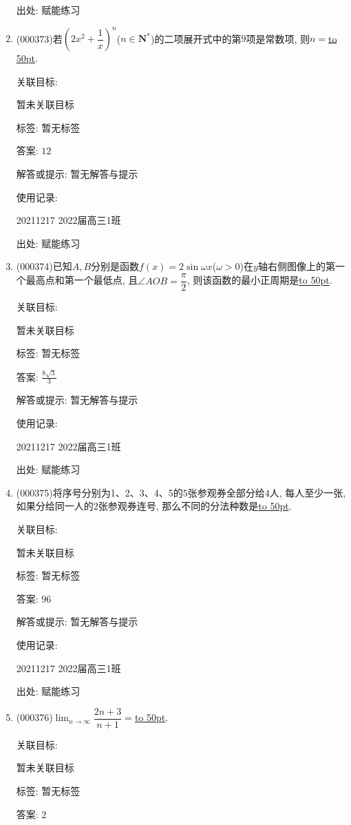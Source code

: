 \documentclass[10pt,a4paper]{article}
\newcommand{\blank}[1]{\underline{\hbox to #1pt{}}}
\begin{document}
\begin{enumerate}[1.]
出处: 赋能练习
\item { (000373)}若$(2x^2+\dfrac1x)^n$($n\in \mathbf{N}^*$)的二项展开式中的第$9$项是常数项, 则$n=$\blank{50}.


关联目标:

暂未关联目标



标签: 暂无标签

答案: $12$

解答或提示: 暂无解答与提示

使用记录:

20211217	2022届高三1班	


出处: 赋能练习
\item { (000374)}已知$A,B$分别是函数$f(x)=2\sin \omega x$($\omega >0$)在$y$轴右侧图像上的第一个最高点和第一个最低点, 且$\angle AOB=\dfrac\pi 2$, 则该函数的最小正周期是\blank{50}.


关联目标:

暂未关联目标



标签: 暂无标签

答案: $\frac{8\sqrt 3}3$

解答或提示: 暂无解答与提示

使用记录:

20211217	2022届高三1班	


出处: 赋能练习
\item { (000375)}将序号分别为1、2、3、4、5的$5$张参观券全部分给$4$人, 每人至少一张, 如果分给同一人的$2$张参观券连号, 那么不同的分法种数是\blank{50}.


关联目标:

暂未关联目标



标签: 暂无标签

答案: $96$

解答或提示: 暂无解答与提示

使用记录:

20211217	2022届高三1班	


出处: 赋能练习
\item { (000376)}$\displaystyle\lim_{n\to\infty}\dfrac{2n+3}{n+1}=$\blank{50}.


关联目标:

暂未关联目标



标签: 暂无标签

答案: $2$


\end{enumerate}
\end{document}
